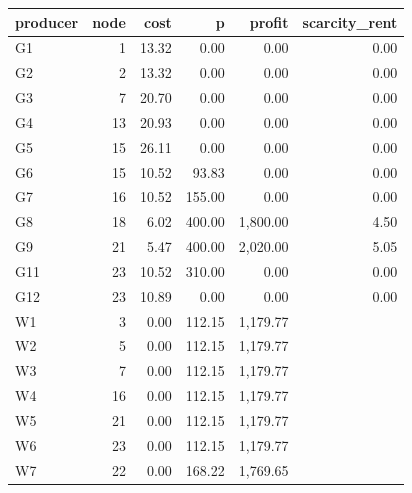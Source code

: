 \begin{tabular}{lrrrrr}
\toprule
producer & node & cost & p & profit & scarcity\_rent \\
\midrule
G1 & 1 & 13.32 & 0.00 & 0.00 & 0.00 \\
G2 & 2 & 13.32 & 0.00 & 0.00 & 0.00 \\
G3 & 7 & 20.70 & 0.00 & 0.00 & 0.00 \\
G4 & 13 & 20.93 & 0.00 & 0.00 & 0.00 \\
G5 & 15 & 26.11 & 0.00 & 0.00 & 0.00 \\
G6 & 15 & 10.52 & 93.83 & 0.00 & 0.00 \\
G7 & 16 & 10.52 & 155.00 & 0.00 & 0.00 \\
G8 & 18 & 6.02 & 400.00 & 1,800.00 & 4.50 \\
G9 & 21 & 5.47 & 400.00 & 2,020.00 & 5.05 \\
G11 & 23 & 10.52 & 310.00 & 0.00 & 0.00 \\
G12 & 23 & 10.89 & 0.00 & 0.00 & 0.00 \\
W1 & 3 & 0.00 & 112.15 & 1,179.77 &  \\
W2 & 5 & 0.00 & 112.15 & 1,179.77 &  \\
W3 & 7 & 0.00 & 112.15 & 1,179.77 &  \\
W4 & 16 & 0.00 & 112.15 & 1,179.77 &  \\
W5 & 21 & 0.00 & 112.15 & 1,179.77 &  \\
W6 & 23 & 0.00 & 112.15 & 1,179.77 &  \\
W7 & 22 & 0.00 & 168.22 & 1,769.65 &  \\
\bottomrule
\end{tabular}
